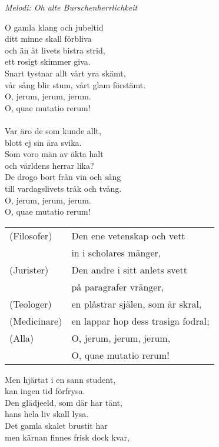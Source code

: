 {\footnotesize\textit{Melodi: Oh alte Burschenherrlichkeit}}

\vspace{10pt}
O gamla klang och jubeltid\\
ditt minne skall förbliva\\
och än åt livets bistra strid,\\
ett rosigt skimmer giva.\\
Snart tystnar allt vårt yra skämt,\\
vår sång blir stum, vårt glam förstämt.\\
O, jerum, jerum, jerum.\\
O, quae mutatio rerum!\\
\\
Var äro de som kunde allt,\\
blott ej sin ära svika.\\
Som voro män av äkta halt\\
och världens herrar lika?\\
De drogo bort från vin och sång\\
till vardagslivets tråk och tvång.\\
O, jerum, jerum, jerum.\\
O, quae mutatio rerum!
\begin{leftborder}
\begin{tabular}{l l}
  (Filosofer)  & Den ene vetenskap och vett\\		
               & in i scholares mänger,\\
  (Jurister)   & Den andre i sitt anlets svett\\
               & på paragrafer vränger,\\
  (Teologer)   & en plåstrar själen, som är skral,\\
  (Medicinare) & en lappar hop dess trasiga fodral;\\
  (Alla)       & O, jerum, jerum, jerum,\\
               & O, quae mutatio rerum!
\end{tabular}
\end{leftborder}
Men hjärtat i en sann student,\\
kan ingen tid förfrysa.\\
Den glädjeeld, som där har tänt,\\
hans hela liv skall lysa.\\
Det gamla skalet brustit har\\
men kärnan finnes frisk dock kvar,\\
